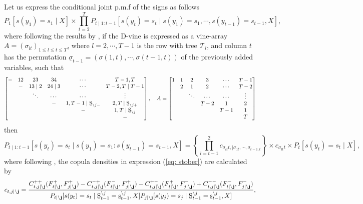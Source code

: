 \documentclass[harvard,11pt]{article}
\begin{document}
Let us express the conditional joint p.m.f of the signs as follows
\begin{equation}
P_1[s(y_1)=s_1\mid X]\times\prod\limits_{t=2}^{T}P_{t\mid 1:{t-1}}[s(y_t)=s_t\mid s(y_1)=s_1,\cdots,s(y_{t-1})=s_{t-1},X],
\end{equation}
where following the results by \citet{stoeber2013simplified}, if the D-vine is expressed as a vine-array $A=(\sigma_{lt})_{1\leq l\leq t\leq T}$, where $l=2,\cdots,T-1$ is the row with tree $\mathcal{T}_l$, and column $t$ has the permutation $\underline{\sigma}_{t-1}=(\sigma(1,t),\cdots,\sigma(t-1,t))$ of the previously added variables, such that
\begin{equation*}
\begin{bmatrix}
- & 12 & 23 &34 &\cdots & T-1,T\\
 &-&13\mid2&24\mid 3&\cdots&T-2,T\mid T-1\\
& & \ddots&\cdots&\cdots&\vdots\\
&&&-&1,T-1\mid \text{\b{S}}_{\backslash j-}&2,T \mid \text{\b{S}}_{\backslash j+}\\
&&&&-&1,T\mid \text{\b{S}}_{\backslash j}\\
&&&&&-
\end{bmatrix},\quad
A=
\begin{bmatrix}
1 & 1 & 2 &3 &\cdots & T-1\\
 &2&1&2&\cdots&T-2\\
& & \ddots&\cdots&\cdots&\vdots\\
&&&T-2&1&2\\
&&&&T-1&1\\
&&&&&T
\end{bmatrix}
\end{equation*}
then 
\begin{equation}\label{eq: stober}
P_{t\mid 1:{t-1}}[s(y_t)=s_t\mid s(y_1)=s_1:s(y_{t-1})=s_{t-1}, X]=\left\{\prod\limits_{l=t-1}^{2} c_{\sigma_{lt}t,\mid \sigma_{1t},\cdots,\sigma_{t-1,t}}\right\}\times c_{\sigma_{lt}t}\times P_t[s(y_t)=s_t\mid X],
\end{equation}
where following \citet{joe2014dependence}, the copula densities in expression (\ref{eq: stober}) are calculated by
\begin{equation}
c_{t,j\mid \mathbf{\backslash j}}=\frac{C_{t,j\mid \mathbf{\backslash j}}^{++}(F_{t\mid \mathbf{\backslash j}}^+,F_{j\mid \mathbf{\backslash j}}^+)-C_{t,j\mid \mathbf{\backslash j}}^{-+}(F_{t\mid \mathbf{\backslash j}}^-,F_{j\mid \mathbf{\backslash j}}^+)-C_{t,j\mid \mathbf{\backslash j}}^{+-}(F_{t\mid \mathbf{\backslash j}}^+,F_{j\mid \mathbf{\backslash j}}^-)+C_{t,j\mid \mathbf{\backslash j}}^{--}(F_{t\mid \mathbf{\backslash j}}^-,F_{j\mid \mathbf{\backslash j}}^-)}{P_{t\mid \mathbf{\backslash j}}[s(y_t)=s_t\mid\text{\b{S}}_{t-1}^{\backslash j}=\text{\b{s}}_{t-1}^{\backslash j},X]P_{j\mid \mathbf{\backslash j}}[s(y_j)=s_j\mid\text{\b{S}}_{t-1}^{\backslash j}=\text{\b{s}}_{t-1}^{\backslash j},X]},
\end{equation}
\end{document}

